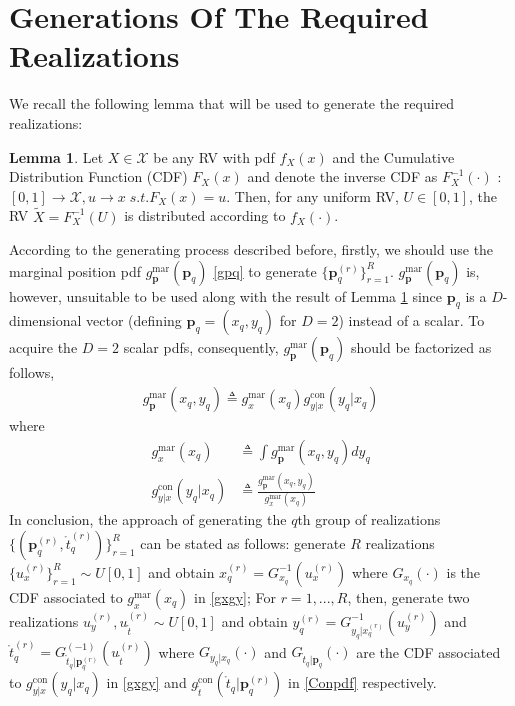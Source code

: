 \documentclass[review]{elsarticle}
\begin{document}
\section{Generations Of The Required Realizations}
We recall the following lemma \cite{Kay2006Intuitive} that will be used to generate the required realizations:
\theoremstyle{definition} \newtheorem{Lemma}{Lemma}
\begin{Lemma}\label{Lemma1}
    Let $X \in \mathcal{X}$ be any RV with pdf $f_X(x)$ and the Cumulative Distribution Function (CDF) $F_X(x)$ and denote the inverse CDF as $F_X^{-1}(\cdot)$ : $[0,1]\to \mathcal{X},  u\to x \; s.t. F_X(x)=u$. Then, for any uniform RV, $U\in [0,1]$, the RV $\tilde{X}=F_X^{-1}(U)$ is distributed according to $f_X(\cdot)$.
\end{Lemma}
According to the generating process described before, firstly, we should use the marginal position pdf $g_{\boldsymbol{p}}^{\text{mar}}(\boldsymbol{p}_q)$ \eqref{gpq} to generate $\lbrace \boldsymbol{p}_q^{(r)}\rbrace_{r=1}^R$. $g_{\boldsymbol{p}}^{\text{mar}}(\boldsymbol{p}_q)$ is, however, unsuitable to be used along with the result of Lemma \ref{Lemma1} since $\boldsymbol{p}_q$ is a $D$-dimensional vector (defining $\boldsymbol{p}_q=(x_q,y_q)$ for $D=2$) instead of a scalar. To acquire the $D=2$ scalar pdfs, consequently, $g_{\boldsymbol{p}}^{\text{mar}}(\boldsymbol{p}_q)$ should be factorized as follows,
\begin{align}
    g_{\boldsymbol{p}}^{\text{mar}}(x_q,y_q)\triangleq g_{x}^{\text{mar}}(x_q)g_{y\vert x}^{\text{con}}(y_q\vert x_q)
\end{align}
where 
\begin{align}\label{gxgy}
    g_{x}^{\text{mar}}(x_q)&\triangleq \int g_{\boldsymbol{p}}^{\text{mar}}(x_q,y_q) dy_q\\
    g_{y\vert x}^{\text{con}}(y_q\vert x_q)&\triangleq \frac{g_{\boldsymbol{p}}^{\text{mar}}(x_q,y_q)}{g_{x}^{\text{mar}}(x_q)}
\end{align}
In conclusion, the approach of generating the $q$th group of realizations $\lbrace(\boldsymbol{p}_q^{(r)},\mathring{t}_q^{(r)})\rbrace_{r=1}^{R}$ can be stated as follows: generate $R$ realizations $\lbrace u_x^{(r)}\rbrace_{r=1}^R\sim U[0,1]$ and obtain $x_q^{(r)}=G_{x_q}^{-1}(u_x^{(r)})$ where $G_{x_q}(\cdot)$ is the CDF associated to $g_{x}^{\text{mar}}(x_q)$ in \eqref{gxgy}; For $r=1,...,R$, then, generate two realizations $u_y^{(r)},u_{\mathring{t}}^{(r)}\sim U[0,1]$ and obtain $y_q^{(r)}=G_{y_q\vert x_q^{(r)}}^{-1}(u_y^{(r)})$ and $\mathring{t}_q^{(r)}=G^{(-1)}_{\mathring{t}_q\vert \boldsymbol{p}_q^{(r)}}(u_{\mathring{t}}^{(r)})$ where $G_{y_q\vert x_q}(\cdot)$ and $G_{\mathring{t}_q\vert \boldsymbol{p}_q}(\cdot)$ are the CDF associated to $g_{y\vert x}^{\text{con}}(y_q\vert x_q)$ in \eqref{gxgy} and $g_{\mathring{t}}^{\text{con}}(\mathring{t}_q\vert \boldsymbol{p}_q^{(r)})$ in \eqref{Conpdf} respectively.
\end{document}
